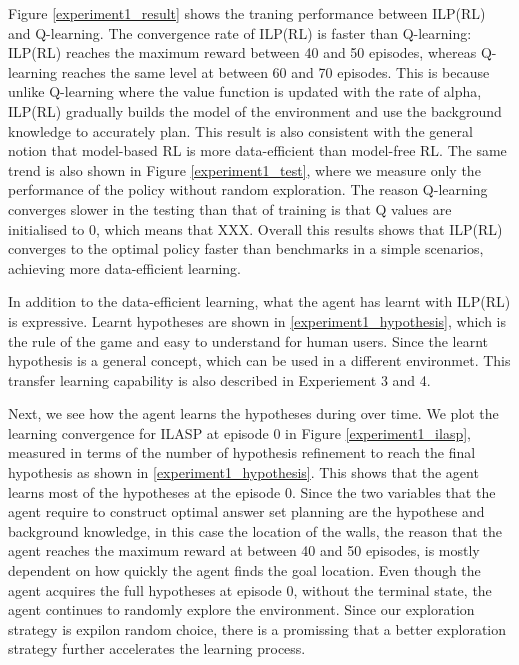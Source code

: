 Figure \ref{experiment1_result} shows the traning performance between ILP(RL) and Q-learning.
The convergence rate of ILP(RL) is faster than Q-learning: ILP(RL) reaches the maximum reward between 40 and 50 episodes, whereas Q-learning reaches the same level at between 60 and 70 episodes.
This is because unlike Q-learning where the value function is updated with the rate of alpha, ILP(RL) gradually builds the model of the environment and use the background knowledge to accurately plan.
This result is also consistent with the general notion that model-based RL is more data-efficient than model-free RL.
The same trend is also shown in Figure \ref{experiment1_test}, where we measure only the performance of the policy without random exploration.
The reason Q-learning converges slower in the testing than that of training is that Q values are initialised to 0, which means that XXX.
Overall this results shows that ILP(RL) converges to the optimal policy faster than benchmarks in a simple scenarios, achieving more data-efficient learning.



% 

In addition to the data-efficient learning, what the agent has learnt with ILP(RL) is expressive.
Learnt hypotheses are shown in \ref{experiment1_hypothesis}, which is the rule of the game and easy to understand for human users.
Since the learnt hypothesis is a general concept, which can be used in a different environmet.
This transfer learning capability is also described in Experiement 3 and 4.

Next, we see how the agent learns the hypotheses during over time. We plot the learning convergence for ILASP at episode 0 in Figure \ref{experiment1_ilasp}, measured in terms of the number of hypothesis refinement to reach the final hypothesis as shown in \ref{experiment1_hypothesis}.
This shows that the agent learns most of the hypotheses at the episode 0.
Since the two variables that the agent require to construct optimal answer set planning are the hypothese and background knowledge, in this case the location of the walls, 
the reason that the agent reaches the maximum reward at between 40 and 50 episodes, is mostly dependent on how quickly the agent finds the goal location.
Even though the agent acquires the full hypotheses at episode 0, without the terminal state, the agent continues to randomly explore the environment.
Since our exploration strategy is expilon random choice, there is a promissing that a better exploration strategy further accelerates the learning process.

